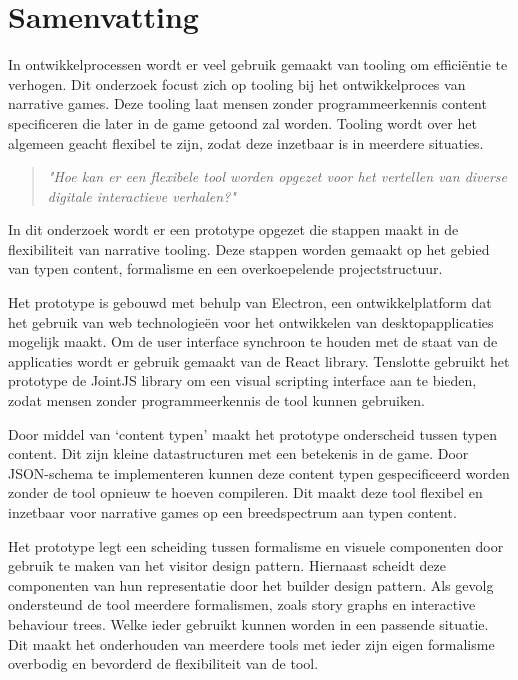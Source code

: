 \chapter*{Samenvatting}
In ontwikkelprocessen wordt er veel gebruik gemaakt van tooling om efficiëntie te verhogen. Dit onderzoek focust zich op tooling bij het ontwikkelproces van narrative games. Deze tooling laat mensen zonder programmeerkennis content specificeren die later in de game getoond zal worden. Tooling wordt over het algemeen geacht flexibel te zijn, zodat deze inzetbaar is in meerdere situaties.
\begin{quote} 
    \centering
    \large
    \textit{
        "Hoe kan er een flexibele tool worden opgezet voor het vertellen van diverse digitale interactieve verhalen?"
    }
\end{quote}

\noindent In dit onderzoek wordt er een prototype opgezet die stappen maakt in de flexibiliteit van narrative tooling. Deze stappen worden gemaakt op het gebied van typen content, formalisme en een overkoepelende projectstructuur.

Het prototype is gebouwd met behulp van Electron, een ontwikkelplatform dat het gebruik van web technologieën voor het ontwikkelen van desktopapplicaties mogelijk maakt. Om de user interface synchroon te houden met de staat van de applicaties wordt er gebruik gemaakt van de React library. Tenslotte gebruikt het prototype de JointJS library om een visual scripting interface aan te bieden, zodat mensen zonder programmeerkennis de tool kunnen gebruiken.

Door middel van ‘content typen’ maakt het prototype onderscheid tussen typen content. Dit zijn kleine datastructuren met een betekenis in de game. Door JSON-schema te implementeren kunnen deze content typen gespecificeerd worden zonder de tool opnieuw te hoeven compileren. Dit maakt deze tool flexibel en inzetbaar voor narrative games op een breedspectrum aan typen content.

Het prototype legt een scheiding tussen formalisme en visuele componenten door gebruik te maken van het visitor design pattern. Hiernaast scheidt deze componenten van hun representatie door het builder design pattern. Als gevolg ondersteund de tool meerdere formalismen, zoals story graphs en interactive behaviour trees. Welke ieder gebruikt kunnen worden in een passende situatie. Dit maakt het onderhouden van meerdere tools met ieder zijn eigen formalisme overbodig en bevorderd de flexibiliteit van de tool.

